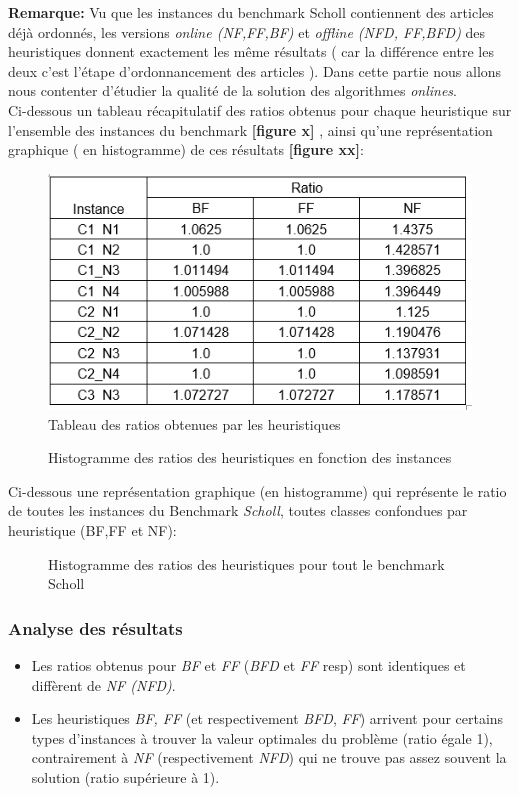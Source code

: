 \documentclass[class=article, crop=false]{standalone}
\begin{document}
\textbf{Remarque:} 
Vu que les instances du benchmark Scholl contiennent des articles déjà ordonnés, les versions \emph{online (NF,FF,BF)} et \emph{offline (NFD, \emph{FF},BFD)} des heuristiques donnent exactement les même résultats ( car la différence entre les deux c’est l’étape d’ordonnancement des articles ). Dans cette partie nous allons nous contenter d’étudier la qualité de la solution des algorithmes \emph{onlines}.\\

Ci-dessous un tableau récapitulatif des ratios obtenus pour chaque heuristique sur l’ensemble des instances du benchmark \textbf{[figure x]} , ainsi qu’une représentation graphique ( en histogramme) de ces résultats \textbf{[figure xx]}:

\begin{figure}[H]
    \includegraphics[width=\linewidth]{../figures/tab_ratio_heur.png}
    \caption{Tableau des ratios obtenues par les heuristiques}
\end{figure}

\begin{figure}[H] 
    \caption{Histogramme des ratios des heuristiques en fonction des instances}
\end{figure}

Ci-dessous une représentation graphique (en histogramme) qui représente le ratio de toutes les instances du Benchmark \emph{Scholl}, toutes classes confondues par heuristique (BF,FF et NF): 

\begin{figure}[H] 
    \caption{Histogramme des ratios des heuristiques pour tout le benchmark Scholl}
\end{figure}

\subsubsection{Analyse des résultats}
\begin{itemize}
    \item Les ratios obtenus pour \emph{BF} et \emph{FF} (\emph{BFD} et \emph{FF} resp) sont identiques et diffèrent de \emph{NF (NFD)}.
    \item Les heuristiques \emph{BF, FF} (et respectivement \emph{BFD}, \emph{FF}) arrivent pour certains types d’instances à trouver la valeur optimales du problème (ratio égale 1), contrairement à \emph{NF} (respectivement \emph{NFD}) qui ne trouve pas assez souvent la solution (ratio supérieure à 1).
\end{itemize}
\end{document}
